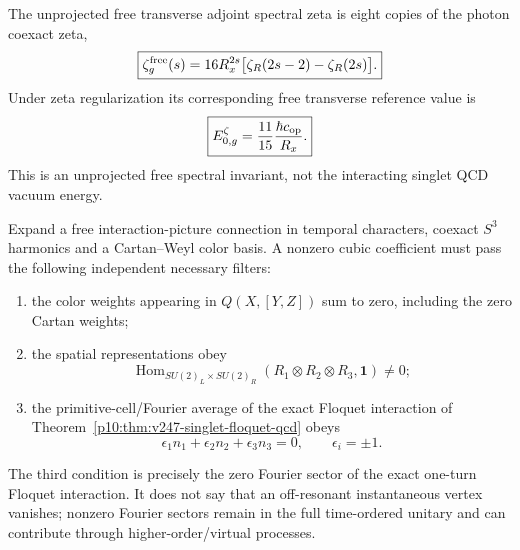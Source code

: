 \documentclass[12pt,a4paper]{article}
\begin{document}
\begin{proposition}
\label{p10:prop:v245-free-gluon-spectral-zeta}
The unprojected free transverse adjoint spectral zeta is eight copies of the
photon coexact zeta,
\[
 \boxed{\zeta_g^{\rm free}(s)
 =16R_x^{2s}\bigl[\zeta_R(2s-2)-\zeta_R(2s)\bigr].}
\]
Under zeta regularization its corresponding free transverse reference value is
\[
 \boxed{E_{0,g}^{\zeta}
 =\frac{11}{15}\frac{\hbar c_{\rm op}}{R_x}.}
\]
This is an unprojected free spectral invariant, not the interacting singlet
QCD vacuum energy.
\end{proposition}

\begin{proposition}
\label{p10:prop:v245-cubic-gluon-selection-filters}
Expand a free interaction-picture connection in temporal characters, coexact
\(S^3\) harmonics and a Cartan--Weyl color basis.  A nonzero cubic coefficient
must pass the following independent necessary filters:
\begin{enumerate}[label=\textnormal{(\roman*)},leftmargin=2.1em]
\item the color weights appearing in
      \(Q(X,[Y,Z])\) sum to zero, including the zero Cartan weights;
\item the spatial representations obey
\[
 \operatorname{Hom}_{SU(2)_L\times SU(2)_R}
 (R_1\otimes R_2\otimes R_3,\mathbf1)\ne0;
\]
\item the primitive-cell/Fourier average of the exact Floquet interaction
      of Theorem~\ref{p10:thm:v247-singlet-floquet-qcd} obeys
\[
 \boxed{\epsilon_1n_1+\epsilon_2n_2+\epsilon_3n_3=0},
 \qquad \epsilon_i=\pm1.
\]
\end{enumerate}
The third condition is precisely the zero Fourier sector of the exact
one-turn Floquet interaction.  It does not say that an off-resonant
instantaneous vertex vanishes; nonzero Fourier sectors remain in the full
time-ordered unitary and can contribute through higher-order/virtual
processes.
\end{proposition}



\end{document}
